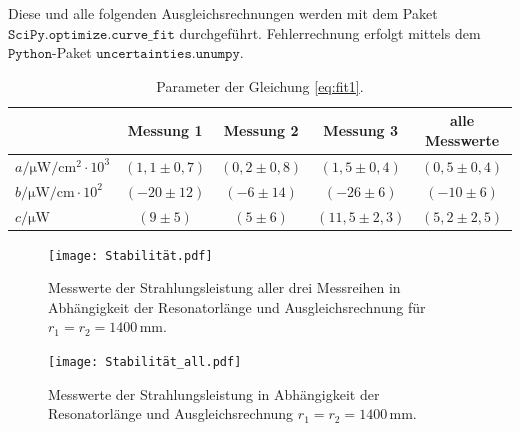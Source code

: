 Diese und alle folgenden Ausgleichsrechnungen werden mit dem Paket 
$\texttt{SciPy.optimize.curve\_fit}$ durchgeführt. 
Fehlerrechnung erfolgt mittels dem $\texttt{Python}$-Paket $\texttt{uncertainties.unumpy}$.
\FloatBarrier
\begin{table}[h]
    \centering
    \caption{Parameter der Gleichung \eqref{eq:fit1}.}
    \label{tab:atab2}
    \begin{tabular}{l c c c c}
        \toprule
        {} & {Messung 1} & {Messung 2} & {Messung 3} & {alle Messwerte} \\
        \midrule
        $a / \si{\micro\W\per\cm\squared}\cdot10^{3}$ & $(1,1 \pm 0,7)$ & $(0,2 \pm 0,8)$ & $(1,5 \pm 0,4)$ & $(0,5 \pm 0,4)$ \\
        $b / \si{\micro\W\per\cm}\cdot10^{2}$ & $(-20 \pm 12)$ & $(-6 \pm 14)$ & $(-26 \pm 6)$ & $(-10 \pm 6)$ \\
        $c / \si{\micro\W}$ & $(9 \pm 5)$ & $(5 \pm 6)$ & $(11,5 \pm 2,3)$ & $(5,2 \pm 2,5)$ \\
        \bottomrule
    \end{tabular}
\end{table}
\FloatBarrier
\noindent
\FloatBarrier
\begin{figure}[h]
\centering
\texttt{[image: Stabilität.pdf]}
\caption{Messwerte der Strahlungsleistung aller drei Messreihen in Abhängigkeit der Resonatorlänge und Ausgleichsrechnung für $r_1=r_2=1400\,\si{\mm}$.}
\label{fig:afig1}
\end{figure}
\FloatBarrier
\noindent
\FloatBarrier
\begin{figure}[h]
\centering
\texttt{[image: Stabilität\_all.pdf]}
\caption{Messwerte der Strahlungsleistung in Abhängigkeit der Resonatorlänge und Ausgleichsrechnung $r_1=r_2=1400\,\si{\mm}$.}
\label{fig:afig2}
\end{figure}
\FloatBarrier
\noindent

